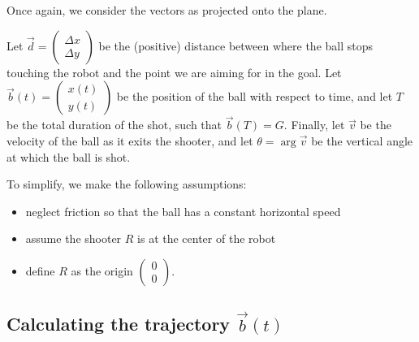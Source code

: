 \documentclass[11pt]{report}
\begin{document}
Once again, we consider the vectors as projected onto the plane.

Let $\vec d = \begin{pmatrix}
		\Delta x \\
		\Delta y
	\end{pmatrix}$ be the (positive) distance between where the ball stops touching the robot and the point we are aiming for in the goal. Let $\vec{b}(t) = \begin{pmatrix}
		x(t) \\
		y(t)
	\end{pmatrix}$ be the position of the ball with respect to time, and let $T$ be the total duration of the shot, such that $\vec{b}(T) = G$. Finally, let $\vec{v}$ be the velocity of the ball as it exits the shooter, and let $\theta = \arg \vec{v}$ be the vertical angle at which the ball is shot.


To simplify, we make the following assumptions:
\begin{itemize}
	\item neglect friction so that the ball has a constant horizontal speed
	\item assume the shooter $R$ is at the center of the robot
	\item define $R$ as the origin $\begin{pmatrix}
			      0 \\
			      0
		      \end{pmatrix}$.
\end{itemize}

\subsection{Calculating the trajectory \texorpdfstring{$\vec{b}(t)$}{b(t)}}
\end{document}
